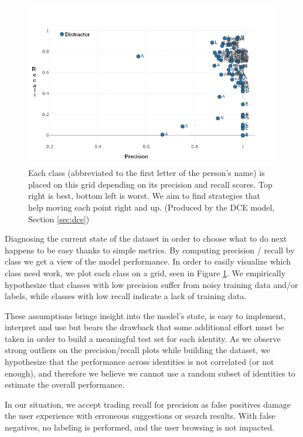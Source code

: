 \begin{figure}
    \centering
    \includegraphics[width=\columnwidth]{50-files/pr-plot.png}
    \caption{Each class (abbreviated to the first letter of the person's name) is placed on this grid depending on its precision and recall scores. Top right is best, bottom left is worst. We aim to find strategies that help moving each point right and up. (Produced by the DCE model, Section \ref{sec:dce})}
    \label{fig:pr-plot}
\end{figure}


Diagnosing the current state of the dataset in order to choose what to do next happens to be easy thanks to simple metrics. By computing precision / recall by class we get a view of the model performance. In order to easily visualize which class need work, we plot each class on a grid, seen in Figure \ref{fig:pr-plot}. We empirically hypothesize that classes with low precision suffer from noisy training data and/or labels, while classes with low recall indicate a lack of training data.

These assumptions brings insight into the model's state, is easy to implement, interpret and use but bears the drawback that some additional effort must be taken in order to build a meaningful test set for each identity. As we observe strong outliers on the precision/recall plots while building the dataset, we hypothesize that the performance across identities is not correlated (or not enough), and therefore we believe we cannot use a random subset of identities to estimate the overall performance.

In our situation, we accept trading recall for precision as false positives damage the user experience with erroneous suggestions or search results. With false negatives, no labeling is performed, and the user browsing is not impacted.

